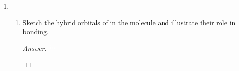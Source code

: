 \documentclass[../psets.tex]{subfiles}
\begin{document}
\begin{enumerate}
\begin{enumerate}
\begin{proof}[Answer]
        \end{proof}
        \item If the incident radiation has a frequency of $\SI{57.8}{\nano\meter}$, what is the largest electron binding energy that can be measured?
        \begin{proof}
            Using the above equation again, if $\nu=\SI{57.8}{\nano\meter}$, the largest electron binding energy that can be measured is that which gives a $KE$ detectably greater than zero. Numerically,
            \begin{align*}
                0 &< KE\\
                0 &< h\nu-W\\
                W &< h\nu\\
                &= \SI{3.83}{\joule}
            \end{align*}
            i.e., the largest energy that can be measured is bounded by .
        \end{proof}
    \end{enumerate}
    \item 
    \begin{enumerate}
        \item Sketch the hybrid orbitals of  in the molecule  and illustrate their role in bonding.
        \begin{proof}[Answer]
            ${\color{white}hi}$
            \begin{center}
\end{center}
\end{proof}
\end{enumerate}
\end{enumerate}
\end{document}
